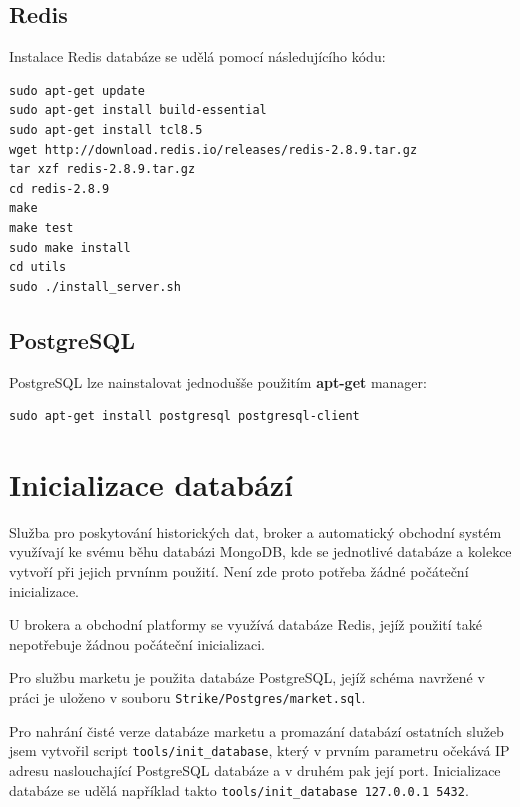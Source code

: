 \documentclass[thesis=M,czech]{FITthesis}[2012/06/26]
\begin{document}
\subsection{Redis}	
	
	Instalace Redis databáze se udělá pomocí následujícího kódu:
	
\begin{lstlisting}[basicstyle={\tiny\ttfamily}, frame=single]
sudo apt-get update
sudo apt-get install build-essential
sudo apt-get install tcl8.5
wget http://download.redis.io/releases/redis-2.8.9.tar.gz
tar xzf redis-2.8.9.tar.gz
cd redis-2.8.9
make
make test
sudo make install
cd utils
sudo ./install_server.sh
\end{lstlisting}


\subsection{PostgreSQL}

	PostgreSQL lze nainstalovat jednodušše použitím \textbf{apt-get} manager:

\begin{lstlisting}[basicstyle={\tiny\ttfamily}, frame=single]
sudo apt-get install postgresql postgresql-client
\end{lstlisting}


\section{Inicializace databází}
	
	Služba pro poskytování historických dat, broker a automatický obchodní systém využívají ke svému běhu databázi MongoDB, kde se jednotlivé databáze a kolekce vytvoří při jejich prvnínm použití. Není zde proto potřeba žádné počáteční inicializace.
	
	U brokera a obchodní platformy se využívá databáze Redis, jejíž použití také nepotřebuje žádnou počáteční inicializaci.
	
	Pro službu marketu je použita databáze PostgreSQL, jejíž schéma navržené v práci \cite{Fremunt2014} je uloženo v souboru \texttt{Strike/Postgres/market.sql}. 
	
	Pro nahrání čisté verze databáze marketu a promazání databází ostatních služeb jsem vytvořil script \texttt{tools/init\_database}, který v prvním parametru očekává IP adresu naslouchající PostgreSQL databáze a v druhém pak její port. Inicializace databáze se udělá například takto \texttt{tools/init\_database 127.0.0.1 5432}.
		
\end{document}
